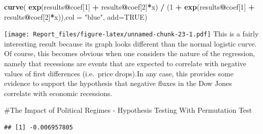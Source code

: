 \documentclass[]{article}
\newenvironment{Shaded}{\begin{snugshade}}{\end{snugshade}}
\newcommand{\DataTypeTok}[1]{\textcolor[rgb]{0.13,0.29,0.53}{#1}}
\newcommand{\DecValTok}[1]{\textcolor[rgb]{0.00,0.00,0.81}{#1}}
\newcommand{\KeywordTok}[1]{\textcolor[rgb]{0.13,0.29,0.53}{\textbf{#1}}}
\newcommand{\NormalTok}[1]{#1}
\newcommand{\OperatorTok}[1]{\textcolor[rgb]{0.81,0.36,0.00}{\textbf{#1}}}
\newcommand{\OtherTok}[1]{\textcolor[rgb]{0.56,0.35,0.01}{#1}}
\newcommand{\StringTok}[1]{\textcolor[rgb]{0.31,0.60,0.02}{#1}}
\begin{document}
\begin{Shaded}
\begin{Highlighting}[]
\KeywordTok{curve}\NormalTok{( }\KeywordTok{exp}\NormalTok{(results}\OperatorTok{@}\NormalTok{coef[}\DecValTok{1}\NormalTok{] }\OperatorTok{+}\StringTok{ }\NormalTok{results}\OperatorTok{@}\NormalTok{coef[}\DecValTok{2}\NormalTok{]}\OperatorTok{*}\NormalTok{x) }\OperatorTok{/}\StringTok{ }\NormalTok{(}\DecValTok{1} \OperatorTok{+}\StringTok{ }\KeywordTok{exp}\NormalTok{(results}\OperatorTok{@}\NormalTok{coef[}\DecValTok{1}\NormalTok{] }\OperatorTok{+}\StringTok{ }\NormalTok{results}\OperatorTok{@}\NormalTok{coef[}\DecValTok{2}\NormalTok{]}\OperatorTok{*}\NormalTok{x)),}\DataTypeTok{col =} \StringTok{"blue"}\NormalTok{, }\DataTypeTok{add=}\OtherTok{TRUE}\NormalTok{)}
\end{Highlighting}
\end{Shaded}

\texttt{[image: Report\_files/figure-latex/unnamed-chunk-23-1.pdf]} This
is a fairly interesting result because its graph looks different than
the normal logistic curve. Of course, this becomes obvious when one
considers the nature of the regression, namely that recessions are
events that are expected to correlate with negative values of first
differences (i.e.~price drops).In any case, this provides some evidence
to support the hypothesis that negative fluxes in the Dow Jones
correlate with economic recessions.

\#The Impact of Political Regimes - Hypothesis Testing With Permutation
Test

\begin{Shaded}
\end{Shaded}

\begin{verbatim}
## [1] -0.006957805
\end{verbatim}

\begin{Shaded}
\end{Shaded}
\end{document}
